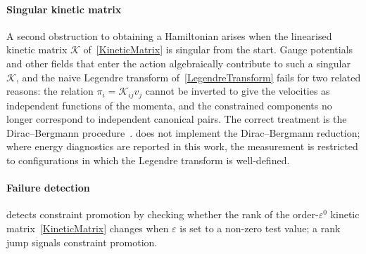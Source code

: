 \paragraph*{Singular kinetic matrix}\label{DiracBergmann}
A second obstruction to obtaining a Hamiltonian arises when the linearised kinetic
matrix $\mathcal{K}$ of~\cref{KineticMatrix} is singular from the start. Gauge
potentials and other fields that enter the action algebraically contribute to such a
singular $\mathcal{K}$, and the naive Legendre transform of~\cref{LegendreTransform}
fails for two related reasons: the relation $\pi_i = \mathcal{K}_{ij} v_j$ cannot be
inverted to give the velocities as independent functions of the momenta, and the
constrained components no longer correspond to independent canonical pairs. The
correct treatment is the Dirac--Bergmann
procedure~\cite{Dirac:1950pj,henneaux1992quantization,barker2021hamiltonian,barker2023higgs}.
\TIDAL{} does not implement the Dirac--Bergmann reduction; where energy diagnostics
are reported in this work, the measurement is restricted to configurations in which
the Legendre transform is well-defined.

\paragraph*{Failure detection}
\TIDAL{} detects constraint promotion by checking whether the rank of the
order-$\varepsilon^0$ kinetic matrix~\cref{KineticMatrix} changes when
$\varepsilon$ is set to a non-zero test value; a rank jump signals constraint
promotion.
